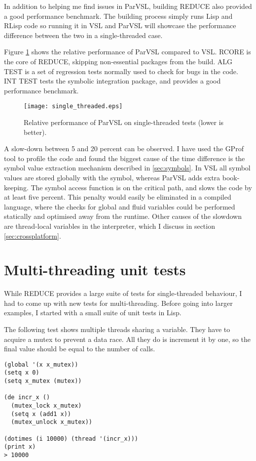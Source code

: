 In addition to helping me find issues in ParVSL, building REDUCE also provided a
good performance benchmark. The building process simply runs Lisp and RLisp code so
running it in VSL and ParVSL will showcase the performance difference between the
two in a single-threaded case.

Figure \ref{fig:single-threaded} shows the relative performance of ParVSL compared to VSL.
RCORE is the core of REDUCE, skipping non-essential packages from the build. ALG TEST is
a set of regression tests normally used to check for bugs in the code. INT TEST tests the
symbolic integration package, and provides a good performance benchmark.

\begin{figure}[h]
  \centering
  \texttt{[image: single\_threaded.eps]}
  \caption{Relative performance of ParVSL on single-threaded tests (lower is better).}
  \label{fig:single-threaded}
\end{figure}


A slow-down between 5 and 20 percent can be observed. I have used the GProf \cite{gprof}
tool to profile the code and found the biggest cause of the time difference is the
symbol value extraction mechanism described in \ref{sec:symbols}. In VSL all symbol
values are stored globally with the symbol, whereas ParVSL adds extra book-keeping.
The symbol access function is on the critical path, and slows the code by at least
five percent. This penalty would easily be eliminated in a compiled language, where the
checks for global and fluid variables could be performed statically and optimised away
from the runtime. Other causes of the slowdown are thread-local variables in the interpreter,
which I discuss in section \ref{sec:crossplatform}.

\section{Multi-threading unit tests}

While REDUCE provides a large suite of tests for single-threaded behaviour, I had to come
up with new tests for multi-threading. Before going into larger examples, I started with a small
suite of unit tests in Lisp.

The following test shows multiple threads sharing a variable. They have to acquire
a mutex to prevent a data race. All they do is increment it by one, so the final
value should be equal to the number of calls.

\label{lst:shared-global}
\begin{verbatim}
(global '(x x_mutex))
(setq x 0)
(setq x_mutex (mutex))

(de incr_x ()
  (mutex_lock x_mutex)
  (setq x (add1 x))
  (mutex_unlock x_mutex))

(dotimes (i 10000) (thread '(incr_x)))
(print x)
> 10000
\end{verbatim}


